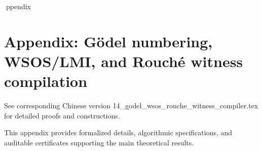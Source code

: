 ppendix

\section*{Appendix: Gödel numbering, WSOS/LMI, and Rouché witness compilation}

See corresponding Chinese version 14_godel_wsos_rouche_witness_compiler.tex for detailed proofs and constructions.

This appendix provides formalized details, algorithmic specifications, and auditable certificates supporting the main theoretical results.

